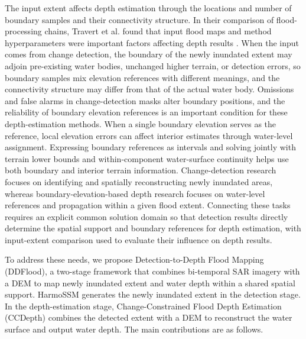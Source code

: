 \documentclass[authoryear,preprint,12pt]{elsarticle}
\begin{document}
The input extent affects depth estimation through the locations and number of boundary samples and their connectivity structure. In their comparison of flood-processing chains, Travert et al. found that input flood maps and method hyperparameters were important factors affecting depth results \citep{travert2026uncertainty}. When the input comes from change detection, the boundary of the newly inundated extent may adjoin pre-existing water bodies, unchanged higher terrain, or detection errors, so boundary samples mix elevation references with different meanings, and the connectivity structure may differ from that of the actual water body. Omissions and false alarms in change-detection masks alter boundary positions, and the reliability of boundary elevation references is an important condition for these depth-estimation methods. When a single boundary elevation serves as the reference, local elevation errors can affect interior estimates through water-level assignment. Expressing boundary references as intervals and solving jointly with terrain lower bounds and within-component water-surface continuity helps use both boundary and interior terrain information. Change-detection research focuses on identifying and spatially reconstructing newly inundated areas, whereas boundary-elevation-based depth research focuses on water-level references and propagation within a given flood extent. Connecting these tasks requires an explicit common solution domain so that detection results directly determine the spatial support and boundary references for depth estimation, with input-extent comparison used to evaluate their influence on depth results.

To address these needs, we propose Detection-to-Depth Flood Mapping (DDFlood), a two-stage framework that combines bi-temporal SAR imagery with a DEM to map newly inundated extent and water depth within a shared spatial support. HarmoSSM generates the newly inundated extent in the detection stage. In the depth-estimation stage, Change-Constrained Flood Depth Estimation (CCDepth) combines the detected extent with a DEM to reconstruct the water surface and output water depth. The main contributions are as follows.
\end{document}
